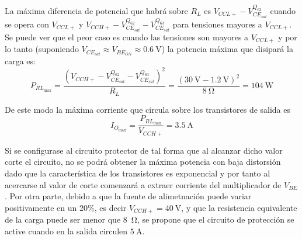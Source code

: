 	La máxima diferencia de potencial que habrá sobre $R_L$ es $V_{CCL+} - V^{Q_{63}}_{CE_{sat}}$ cuando se opera con $V_{CCL+}$ y $V_{CCH+} - V^{Q_{62}}_{CE_{sat}} - V^{Q_{63}}_{CE_{sat}}$ para tensiones mayores a $V_{CCL+}$. Se puede ver que el peor caso es cuando las tensiones son mayores a $V_{CCL+}$ y por lo tanto (suponiendo $V_{CE_{sat}} \approx V_{BE_{ON}} \approx \SI{0.6}{\V}$) la potencia máxima que disipará la carga es:
		\begin{equation*}
			P_{RL_{\max}} = \frac{\left(V_{CCH+} - V^{Q_{62}}_{CE_{sat}} - V^{Q_{63}}_{CE_{sat}}\right)^2}{R_L} = \frac{\left(\SI{30}{\V} - \SI{1.2}{\V}\right)^2}{\SI{8}{\ohm}} = \SI{104}{\W}
		\end{equation*}

	De este modo la máxima corriente que circula sobre los transistores de salida es
		\begin{equation*}
			\boxed{I_{O_{\max}} = \frac{P_{RL_{\max}}}{V_{CCH+}} = \SI{3.5}{\A}}
		\end{equation*}



	Si se configurase al circuito protector de tal forma que al alcanzar dicho valor corte el circuito, no se podrá obtener la máxima potencia con baja distorsión dado que la característica de los transistores es exponencial y por tanto al acercarse al valor de corte comenzará a extraer corriente del multiplicador de $V_{BE}$. Por otra parte, debido a que la fuente de alimetnación puede variar positivamente en un 20\%, es decir $V_{CCH+}=\SI{40}{\V}$, y que la resistencia equivalente de la carga puede ser menor que \SI{8}{\ohm}, se propone que el circuito de protección se active cuando en la salida circulen $\SI{5}{\ampere}$.

